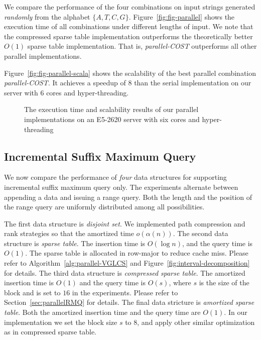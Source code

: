 We compare the performance of the four combinations on input strings
generated {\em randomly} from the alphabet $\{A, T, C, G\}$.
Figure~\ref{fig:fig-parallel} shows the execution time of all
combinations under different lengths of input.  We note that the
compressed sparse table implementation outperforms the theoretically
better $O(1)$ sparse table implementation.  That is, {\em
  parallel-COST} outperforms all other parallel implementations.

Figure~\ref{fig:fig-parallel-scala} shows the scalability of the best
parallel combination {\em parallel-COST}.  It achieves a speedup of
$8$ than the serial implementation on our server with 6 cores and
hyper-threading.

\iffalse
我們運行優化策略中的空間壓縮版本，而非理論分析的 $\theta(1)$ 操作，
單次詢問落在 $O(s)$ 中，在實作上由於可以完全壓在暫存器上操作，效能表現較佳。
\fi

\begin{figure}
  \centering
  \caption{The execution time and scalability results of our parallel
    implementations on an E5-2620 server with six cores and
    hyper-threading}
\end{figure}


\subsection{Incremental Suffix Maximum Query}

We now compare the performance of {\em four} data structures for
supporting incremental suffix maximum query only.  The experiments
alternate between appending a data and issuing a range query.  Both
the length and the position of the range query are uniformly
distributed among all possibilities.

The first data structure is {\em disjoint set}.  We implemented path
compression and rank strategies so that the amortized time
$o(\alpha(n))$.  The second data structure is {\em sparse table}.  The
insertion time is $O(\log n)$, and the query time is $O(1)$.  The
sparse table is allocated in row-major to reduce cache miss.  Please
refer to Algorithm~\ref{alg:parallel-VGLCS} and
Figure~\ref{fig:interval-decomposition} for details.  The third data
structure is {\em compressed sparse table}.  The amortized insertion
time is $O(1)$ and the query time is $O(s)$, where $s$ is the size of
the block and is set to $16$ in the experiments.  Please refer to
Section~\ref{sec:parallelRMQ} for details.  The final data stricture
is {\em amortized sparse table}.  Both the amortized insertion time
and the query time are $O(1)$.  In our implementation we set the block
size $s$ to $8$, and apply other similar optimization as in compressed
sparse table.

